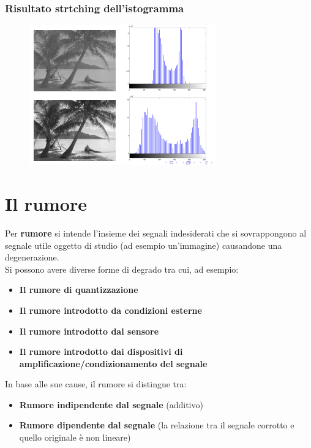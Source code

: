 \subsubsection{Risultato strtching dell'istogramma}

\begin{figure}[H]
    \centering
    \includegraphics[width=\linewidth, keepaspectratio]{capitoli/immagini/imgs/stretch-isto.png}
\end{figure}

\section{Il rumore}

Per \textbf{rumore} si intende l’insieme dei segnali indesiderati che si sovrappongono al segnale utile oggetto di studio (ad esempio un’immagine) causandone una degenerazione.
\\
Si possono avere diverse forme di degrado tra cui, ad esempio:
\begin{itemize}
    \item \textbf{Il rumore di quantizzazione}
    \item \textbf{Il rumore introdotto da condizioni esterne}
    \item \textbf{Il rumore introdotto dal sensore}
    \item \textbf{Il rumore introdotto dai dispositivi di amplificazione/condizionamento del segnale}
\end{itemize}

In base alle sue cause, il rumore si distingue tra:
\begin{itemize}
    \item \textbf{Rumore indipendente dal segnale} (additivo)
    \item \textbf{Rumore dipendente dal segnale} (la relazione tra il segnale corrotto e quello originale è non lineare)
\end{itemize}

